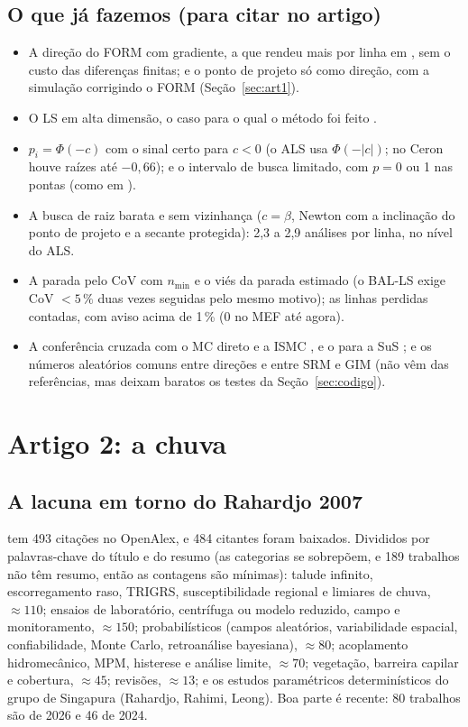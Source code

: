 \documentclass[11pt,a4paper]{article}
\begin{document}
\subsection{O que já fazemos (para citar no artigo)}
\begin{itemize}
  \item A direção do FORM com gradiente, a que rendeu mais por linha em \citet{dang2024}, sem o custo das diferenças
    finitas; e o ponto de projeto só como direção, com a simulação corrigindo o FORM \citep{valdebenito2010}
    (Seção~\ref{sec:art1}).
  \item O LS em alta dimensão, o caso para o qual o método foi feito \citep{koutsourelakis2004,schueller2004}.
  \item $p_i = \Phi(-c)$ com o sinal certo para $c < 0$ (o ALS usa $\Phi(-|c|)$; no Ceron houve raízes até $-0{,}66$);
    e o intervalo de busca limitado, com $p = 0$ ou 1 nas pontas (como em \citealp{cheng2025}).
  \item A busca de raiz barata e sem vizinhança ($c = \beta$, Newton com a inclinação do ponto de projeto e a secante
    protegida): 2,3 a 2,9 análises por linha, no nível do ALS.
  \item A parada pelo CoV com $n_\text{min}$ e o viés da parada estimado (o BAL-LS exige CoV $< 5\,\%$ duas vezes
    seguidas pelo mesmo motivo); as linhas perdidas contadas, com aviso acima de 1\,\% (0 no MEF até agora).
  \item A conferência cruzada com o MC direto e a ISMC \citep{pradlwarter2007,valdebenito2010}, e o  para
    a SuS \citep{vandeneijnden2017}; e os números aleatórios comuns entre direções e entre SRM e GIM (não vêm das
    referências, mas deixam baratos os testes da Seção~\ref{sec:codigo}).
\end{itemize}

\section{Artigo 2: a chuva}\label{sec:chuva}
\subsection{A lacuna em torno do Rahardjo 2007}
\citet{rahardjo2007} tem 493 citações no OpenAlex, e 484 citantes foram baixados. Divididos por palavras-chave do título
e do resumo (as categorias se sobrepõem, e 189 trabalhos não têm resumo, então as contagens são mínimas):
talude infinito, escorregamento raso, TRIGRS, susceptibilidade regional e limiares de chuva, $\approx 110$; ensaios de
laboratório, centrífuga ou modelo reduzido, campo e monitoramento, $\approx 150$; probabilísticos (campos aleatórios,
variabilidade espacial, confiabilidade, Monte Carlo, retroanálise bayesiana), $\approx 80$; acoplamento hidromecânico,
MPM, histerese e análise limite, $\approx 70$; vegetação, barreira capilar e cobertura, $\approx 45$; revisões,
$\approx 13$; e os estudos paramétricos determinísticos do grupo de Singapura (Rahardjo, Rahimi, Leong). Boa parte é
recente: 80 trabalhos são de 2026 e 46 de 2024.
\end{document}

